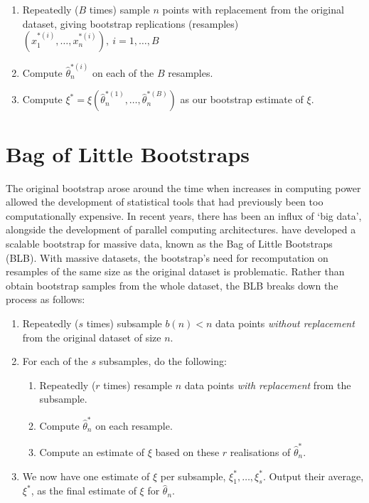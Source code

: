\documentclass{article}
\begin{document}
\begin{enumerate}
\item Repeatedly ($B$ times) sample $n$ points with replacement from the original
dataset, giving bootstrap replications (resamples) $(x_1^{*(i)},\ldots,x_n^{*(i)}),\ i=1,\ldots,B$
\item Compute $\hat\theta_n^{*(i)}$ on each of the $B$ resamples.
\item Compute $\xi^*=\xi(\hat\theta_n^{*(1)},\ldots,\hat\theta_n^{*(B)})$ as our bootstrap estimate of $\xi$.
\end{enumerate}



\section{Bag of Little Bootstraps}
The original bootstrap arose around the time when increases in computing power allowed the development of statistical tools that had previously been too computationally expensive. In recent years, there has been an influx of `big data', alongside the development of parallel computing architectures. \textcite{Kleiner2014} have developed a scalable bootstrap for massive data, known as the Bag of Little Bootstraps (BLB). With massive datasets, the bootstrap's need for recomputation on resamples of the same size as the original dataset is problematic. Rather than obtain bootstrap samples from the whole dataset, the BLB breaks down the process as follows:

\begin{enumerate}
\item Repeatedly ($s$ times) subsample $b(n) < n$ data points \emph{without replacement} from the original dataset of size $n$.
\item For each of the $s$ subsamples, do the following:
\begin{enumerate}
\item Repeatedly ($r$ times) resample $n$ data points \emph{with replacement} from the subsample.
\item Compute $\hat\theta_n^*$ on each resample.
\item Compute an estimate of $\xi$ based on these $r$ realisations of $\hat\theta_n^*$.
\end{enumerate}
\item We now have one estimate of $\xi$ per subsample, $\xi^*_1, \ldots, \xi^*_s$. Output their average, $\xi^*$, as the final estimate of $\xi$ for $\hat\theta_n$.
\end{enumerate}
\end{document}
